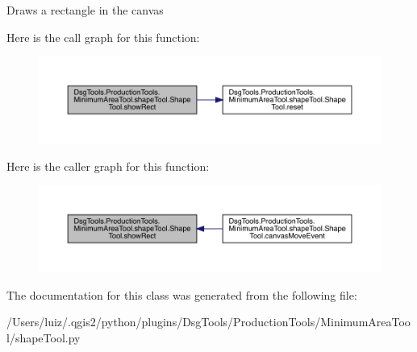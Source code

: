 \begin{DoxyVerb}Draws a rectangle in the canvas
\end{DoxyVerb}
 Here is the call graph for this function\+:
\nopagebreak
\begin{figure}[H]
\begin{center}
\leavevmode
\includegraphics[width=350pt]{class_dsg_tools_1_1_production_tools_1_1_minimum_area_tool_1_1shape_tool_1_1_shape_tool_a60b9a4ad2d682db2e8ab8f10006eb12e_cgraph}
\end{center}
\end{figure}
Here is the caller graph for this function\+:
\nopagebreak
\begin{figure}[H]
\begin{center}
\leavevmode
\includegraphics[width=350pt]{class_dsg_tools_1_1_production_tools_1_1_minimum_area_tool_1_1shape_tool_1_1_shape_tool_a60b9a4ad2d682db2e8ab8f10006eb12e_icgraph}
\end{center}
\end{figure}


The documentation for this class was generated from the following file\+:\begin{DoxyCompactItemize}
\item 
/\+Users/luiz/.\+qgis2/python/plugins/\+Dsg\+Tools/\+Production\+Tools/\+Minimum\+Area\+Tool/shape\+Tool.\+py\end{DoxyCompactItemize}
